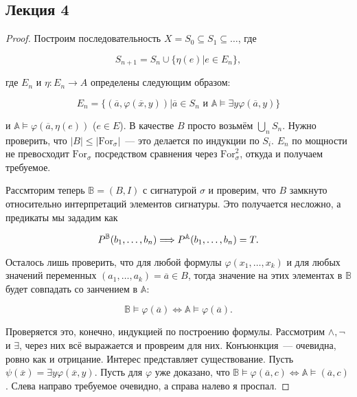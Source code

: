 \subsection{Лекция 4}

\begin{proof}
    Построим последовательность $X = S_0 \subseteq S_1 \subseteq \ldots$, где 

    \[ 
        S_{n+1} = S_n \cup \{\eta(e)| e \in E_n\},
    \]

    где $E_n$ и $\eta: E_n \rightarrow A$ определены следующим образом: 

    \[ 
        E_n = \{(\overline{a}, \varphi(\overline{x}, y))| \overline{a} \in S_n \text{ и } \mathbb{A} \models \exists y \varphi(\overline{a}, y)\}
    \]

    и $\mathbb{A} \models \varphi(\overline{a}, \eta(e))$ ($e \in E$). В качестве $B$ просто возьмём $\bigcup_n S_n$. Нужно проверить, что $|B| \leq |\text{For}_{\sigma}|$~— это делается по индукции по $S_i$. $E_n$ по мощности не превосходит $\text{For}_{\sigma}$ посредством сравнения через $\text{For}_\sigma^2$, откуда и получаем требуемое. \ 
    
    Рассмторим теперь $\mathbb{B} = (B, I)$ с сигнатурой $\sigma$ и проверим, что $B$ замкнуто относительно интерпретаций элементов сигнатуры. Это получается несложно, а предикаты мы зададим как  

    \[ 
        P^{\mathbb{B}}(b_1, \ldots, b_n) \Longrightarrow P^{\mathbb{A}}(b_1, \ldots, b_n) = T.
    \]

    Осталось лишь проверить, что для любой формулы $\varphi(x_1, \ldots, x_k)$ и для любых значений переменных $(a_1, \ldots, a_k) = \overline{a} \in B$, тогда значение на этих элементах в $\mathbb{B}$ будет совпадать со занчением в $\mathbb{A}$: 

    \[ 
        \mathbb{B} \models \varphi(\overline{a}) \Longleftrightarrow \mathbb{A} \models \varphi(\overline{a}).
    \]

    Проверяется это, конечно, индукцией по построению формулы. Рассмотрим $\wedge, \neg$ и $\exists$, через них всё выражается и провреим для них. Конъюнкция~— очевидна, ровно как и отрицание. Интерес представляет существование. Пусть $\psi(\overline{x}) = \exists y \varphi(\overline{x}, y)$. Пусть для $\varphi$ уже доказано, что $\mathbb{B} \models \varphi(\overline{a}, c) \Longleftrightarrow \mathbb{A} \models(\overline{a}, c)$. Слева направо требуемое очевидно, а справа налево я проспал.
\end{proof} 


